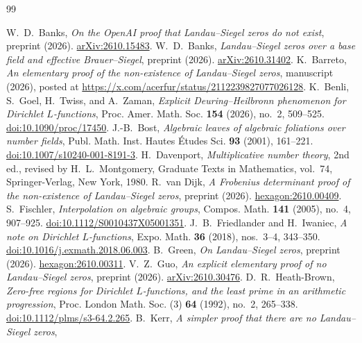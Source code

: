 \documentclass[11pt,a4paper]{amsart}
\theoremstyle{remark}
\numberwithin{equation}{section}
\begin{document}
\begin{thebibliography}{99}
\raggedright
{}
W.~D.~Banks, \emph{On the OpenAI proof that Landau--Siegel zeros do not exist},
preprint (2026).
\href{https://arxiv.org/abs/2610.15483}{arXiv:2610.15483}.
W.~D.~Banks, \emph{Landau--Siegel zeros over a base field and effective
Brauer--Siegel}, preprint (2026).
\href{https://arxiv.org/abs/2610.31402}{arXiv:2610.31402}.
K.~Barreto, \emph{An elementary proof of the non-existence of
Landau--Siegel zeros}, manuscript (2026), posted at
\url{https://x.com/acerfur/status/2112239827077026128}.
K.~Benli, S.~Goel, H.~Twiss, and A.~Zaman,
\emph{Explicit Deuring--Heilbronn phenomenon for Dirichlet $L$-functions},
Proc. Amer. Math. Soc. \textbf{154} (2026), no.~2, 509--525.
\href{https://doi.org/10.1090/proc/17450}{doi:10.1090/proc/17450}.
J.-B.~Bost, \emph{Algebraic leaves of algebraic foliations over number fields},
Publ. Math. Inst. Hautes \'Etudes Sci. \textbf{93} (2001), 161--221.
\href{https://doi.org/10.1007/s10240-001-8191-3}{doi:10.1007/s10240-001-8191-3}.
H.~Davenport, \emph{Multiplicative number theory}, 2nd ed., revised by
H.~L.~Montgomery, Graduate Texts in Mathematics, vol.~74,
Springer-Verlag, New York, 1980.
R.~van Dijk, \emph{A Frobenius determinant proof of the non-existence of
Landau--Siegel zeros}, preprint (2026).
\href{https://hexagonmath.org/2610.00409}{hexagon:2610.00409}.
S.~Fischler, \emph{Interpolation on algebraic groups},
Compos. Math. \textbf{141} (2005), no.~4, 907--925.
\href{https://doi.org/10.1112/S0010437X05001351}{doi:10.1112/S0010437X05001351}.
J.~B.~Friedlander and H.~Iwaniec, \emph{A note on Dirichlet $L$-functions},
Expo. Math. \textbf{36} (2018), nos.~3--4, 343--350.
\href{https://doi.org/10.1016/j.exmath.2018.06.003}{doi:10.1016/j.exmath.2018.06.003}.
B.~Green, \emph{On Landau--Siegel zeros}, preprint (2026).
\href{https://hexagonmath.org/2610.00311}{hexagon:2610.00311}.
V.~Z.~Guo, \emph{An explicit elementary proof of no Landau--Siegel zeros},
preprint (2026).
\href{https://arxiv.org/abs/2610.30476}{arXiv:2610.30476}.
D.~R.~Heath-Brown, \emph{Zero-free regions for Dirichlet $L$-functions,
and the least prime in an arithmetic progression},
Proc. London Math. Soc. (3) \textbf{64} (1992), no.~2, 265--338.
\href{https://doi.org/10.1112/plms/s3-64.2.265}{doi:10.1112/plms/s3-64.2.265}.
B.~Kerr, \emph{A simpler proof that there are no Landau--Siegel zeros},

\end{thebibliography}
\end{document}
